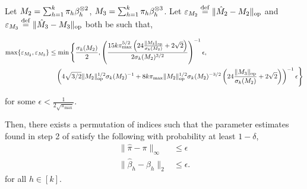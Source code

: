 \begin{lemma}
  \label{lem:tensorPower} 
  Let $M_2 = \sum_{h=1}^{k} \pi_h \beta_h^{\otimes 2}$,
  $M_3 = \sum_{h=1}^{k} \pi_h \beta_h^{\otimes 3}$.
  Let $\varepsilon_{M_2} \stackrel{\rm def}{=} \|\hat M_2 - M_2\|_{\text{\rm op}}$ and
  $\varepsilon_{M_3} \stackrel{\rm def}{=} \|\hat M_3 - M_3\|_{\text{\rm op}}$ both be such that,

\begin{align*}
  \max\{\varepsilon_{M_2}, \varepsilon_{M_3}\} &\le \min\Bigg\{
    \frac{\sigma_k(M_2)}{2},
      \left(\frac{15 k \pi_{\max}^{5/2}
      \left(24 \frac{\| {M_3} \|_{\text{\rm op}}}{\sigma_k(M_2)} + 2\sqrt{2} \right)}{2\sigma_k(M_2)^{3/2}} \right)^{-1} \epsilon,\\
     &\quad 
      \left(
      4\sqrt{3/2} \|M_2\|_{\text{\rm op}}^{1/2} \sigma_k(M_2)^{-1} + 8 k \pi_{\max} 
      \|M_2\|_{\text{\rm op}}^{1/2} \sigma_k(M_2)^{-3/2}
      \left(24 \frac{\| {M_3} \|_{\text{\rm op}}}{\sigma_k(M_2)} + 2\sqrt{2} \right) \right)^{-1} \epsilon
  \Bigg\}
\end{align*}
  
for some $\epsilon < \frac{1}{2\sqrt{\pi_{\max}}}$.

  Then, there exists a permutation of indices such that  the parameter
  estimates found in step 2 of 
  \iftoggle{withappendix}{%
  \algorithmref{algo:spectral-experts}
  }{%
  \citet[Algorithm 1]{ChagantyLiang2013}
  }
  satisfy the following with probability at least $1 - \delta$,
  \begin{align*}
  \|\hat \pi - \pi \|_{\infty} &\le \epsilon \\
  \|\hat \beta_h - \beta_h\|_2 &\le \epsilon.
  \end{align*}
  for all $h \in [k]$.
\end{lemma}

